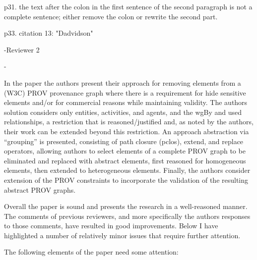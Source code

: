 \documentclass{article}
\begin{document}
p31. the text after the colon in the first sentence of the second paragraph is not a complete sentence; either remove the colon or rewrite the second part.

p33. citation 13: "Dadvidson"


-Reviewer 2

  -

In the paper the authors present their approach for removing elements from a (W3C) PROV provenance graph where there is a requirement for hide sensitive elements and/or for commercial reasons while maintaining validity.  The authors solution considers only entities, activities, and agents, and the wgBy and used relationships, a restriction that is reasoned/justified and, as noted by the authors, their work can be extended beyond this restriction.  An approach abstraction via “grouping” is presented, consisting of path closure (pclos), extend, and replace operators, allowing authors to select elements of a complete PROV graph to be eliminated and replaced with abstract elements, first reasoned for homogeneous elements, then extended to heterogeneous elements.  Finally, the authors consider extension of the PROV constraints to incorporate the validation of the resulting abstract PROV graphs.

Overall the paper is sound and presents the research in a well-reasoned manner.  The comments of previous reviewers, and more specifically the authors responses to those comments, have resulted in good improvements.  Below I have highlighted a number of relatively minor issues that require further attention.

The following elements of the paper need some attention:
\end{document}
